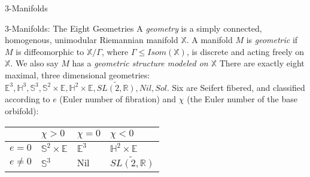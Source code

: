 \documentclass{beamer}
\begin{document}
\begin{section}{3-Manifolds}
\begin{frame}{3-Manifolds: The Eight Geometries}
    A \textit{geometry} is a simply connected, homogenous, unimodular Riemannian manifold $\mathbb{X}$.
    \newline
    \newline
    A manifold $M$ is \textit{geometric} if  $M$ is diffeomorphic to $\mathbb{X}/\Gamma$, where $\Gamma \leq Isom(\mathbb{X})$, is discrete and acting freely on $\mathbb{X}$. We also say $M$ has a \textit{geometric structure modeled on $\mathbb{X}$}
    \newline
    \newline
    There are exactly eight maximal, three dimensional geometries: $\mathbb{E}^3,\mathbb{H}^3,\mathbb{S}^3,\mathbb{S}^2\times \mathbb{E},\mathbb{H}^2\times \mathbb{E},\widetilde{SL(2,\mathbb{R})}, Nil, Sol$.
    \newline
    \newline
    Six are Seifert fibered, and classified according to $e$ (Euler number of fibration) and $\chi$ (the Euler number of the base orbifold):
    \begin{center}
    \begin{tabular}{l|l|l|l}
 
        \quad & $\chi>0$ & $\chi=0$ & $\chi<0$ \\ 
        \hline
        $e=0$ & $\mathbb{S}^2\times \mathbb{E}$ & $\mathbb{E}^3$ & $\mathbb{H}^2\times \mathbb{E}$ \\ 
        $e \neq 0$ & $\mathbb{S}^3$ & Nil & $\widetilde{SL(2,\mathbb{R})}$ \\ 

    \end{tabular}
    \end{center}


\end{frame}{}


\end{section}
\end{document}
